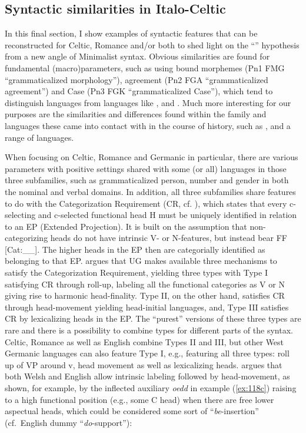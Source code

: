 \documentclass[output=paper,colorlinks,citecolor=brown]{langscibook}
\begin{document}
\subsection{Syntactic similarities in Italo-Celtic}
\label{sec:ItaloCeltic}
\largerpage
\noindent In this final section, I show examples of syntactic features that can be reconstructed for Celtic, Romance and/or both to shed light on the “” hypothesis from a new angle of Minimalist syntax. Obvious similarities are found for fundamental (macro)parameters, such as using bound morphemes (Pn1 FMG “grammaticalized morphology”), agreement (Pn2 FGA ``grammaticalized agreement'') and Case (Pn3 FGK ``grammaticalized Case''), which tend to distinguish  languages from languages like ,  and . Much more interesting for our purposes are the similarities and differences found within the  family and languages these came into contact with in the course of history, such as ,  and a range of  languages.

When focusing on Celtic, Romance and Germanic in particular, there are various parameters with positive settings shared with some (or all) languages in those three subfamilies, such as grammaticalized person, number and gender in both the nominal and verbal domains. In addition, all three subfamilies share features to do with the Categorization Requirement (CR, cf. \citealt{mm:panagiotidis_categorial_2015}), which states that every c-selecting and c-selected functional head H must be uniquely identified in relation to an EP (Extended Projection). It is built on the assumption that non-categorizing heads do not have intrinsic V- or N-features, but instead bear FF [Cat:\_\_]. The higher heads in the EP then are categorially identified as belonging to that EP. \citet[164--166]{mm:roberts_parameter_2019} argues that UG makes available three mechanisms to satisfy the Categorization Requirement, yielding three types with Type I satisfying CR through roll-up, labeling all the functional categories as V or N giving rise to harmonic head-finality. Type II, on the other hand, satisfies CR through head-movement yielding head-initial languages, and, Type III satisfies CR by lexicalizing heads in the EP. The “purest” versions of these three types are rare and there is a possibility to combine types for different parts of the syntax. Celtic, Romance as well as English combine Types II and III, but other West Germanic languages can also feature Type I, e.g.,  featuring all three types: roll up of VP around v, head movement as well as lexicalizing heads. \citet[163]{mm:roberts_parameter_2019} argues that both Welsh and English allow intrinsic labeling followed by head-movement, as shown, for example, by the inflected auxiliary \textit{oedd} in example (\ref{ex:118c}) raising to a high functional position (e.g., some C head) when there are free lower aspectual heads, which could be considered some sort of “\textit{be}-insertion” (cf.\ English dummy “\textit{do}-support”):
\end{document}
